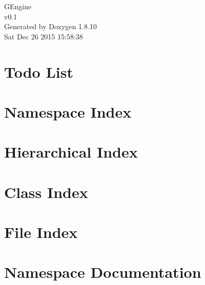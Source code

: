 \documentclass[twoside]{book}
\newcommand{\+}{\discretionary{\mbox{\scriptsize$\hookleftarrow$}}{}{}}
\newcommand{\clearemptydoublepage}{%
  \newpage{\pagestyle{empty}\cleardoublepage}%
}
\begin{document}
\hypersetup{pageanchor=false,
             bookmarks=true,
             bookmarksnumbered=true,
             pdfencoding=unicode
            }
\begin{titlepage}
\vspace*{7cm}
\begin{center}%
{\Large G\+Engine \\[1ex]\large v0.\+1 }\\
\vspace*{1cm}
{\large Generated by Doxygen 1.8.10}\\
\vspace*{0.5cm}
{\small Sat Dec 26 2015 15:58:38}\\
\end{center}
\end{titlepage}
\clearemptydoublepage
\tableofcontents
\clearemptydoublepage
{}
\hypersetup{pageanchor=true}

\chapter{Todo List}
\label{todo}
\hypertarget{todo}{}

\chapter{Namespace Index}

\chapter{Hierarchical Index}

\chapter{Class Index}

\chapter{File Index}

\chapter{Namespace Documentation}

\end{document}
